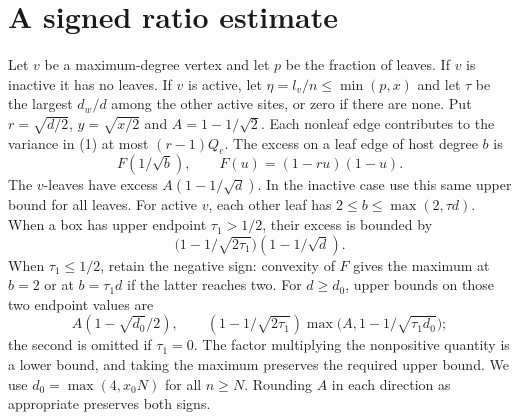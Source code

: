 \section{A signed ratio estimate}
Let $v$ be a maximum-degree vertex and let $p$ be the fraction of leaves. If $v$ is inactive it has no leaves. If $v$ is active, let $\eta=l_v/n\le\min(p,x)$ and let $\tau$ be the largest $d_w/d$ among the other active sites, or zero if there are none. Put $r=\sqrt{d/2}$, $y=\sqrt{x/2}$ and $A=1-1/\sqrt2$. Each nonleaf edge contributes to the variance in (1) at most $(r-1)Q_e$. The excess on a leaf edge of host degree $b$ is
\[
 F(1/\sqrt b),\qquad F(u)=(1-ru)(1-u).
\]
The $v$-leaves have excess $A(1-1/\sqrt d)$. In the inactive case use this same upper bound for all leaves. For active $v$, each other leaf has $2\le b\le\max(2,\tau d)$. When a box has upper endpoint $\tau_1>1/2$, their excess is bounded by
\[
 \bigl(1-1/\sqrt{2\tau_1}\bigr)(1-1/\sqrt d).
\]
When $\tau_1\le1/2$, retain the negative sign: convexity of $F$ gives the maximum at $b=2$ or at $b=\tau_1d$ if the latter reaches two. For $d\ge d_0$, upper bounds on those two endpoint values are
\[
 A(1-\sqrt{d_0}/2),\qquad
 (1-1/\sqrt{2\tau_1})\max\bigl(A,1-1/\sqrt{\tau_1 d_0}\bigr);
\]
the second is omitted if $\tau_1=0$. The factor multiplying the nonpositive quantity is a lower bound, and taking the maximum preserves the required upper bound. We use $d_0=\max(4,x_0N)$ for all $n\ge N$. Rounding $A$ in each direction as appropriate preserves both signs.

